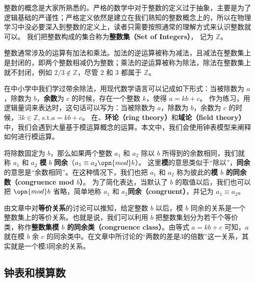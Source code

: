 


整数的概念是大家所熟悉的。严格的数学中对于整数的定义过于抽象，主要是为了逻辑基础的严谨性；严格定义依然是建立在我们熟知的整数概念上的，所以在物理学习中没必要深入到整数的定义上，读者只需要按照通常的理解方式来认识整数就可以。 我们把整数构成的集合称为\textbf{整数集（Set of Integers）}， 记为 $\mathbb{Z}$。

整数通常涉及的运算有加法和乘法。加法的逆运算被称为减法，且减法在整数集上是封闭的，即两个整数相减仍为整数；乘法的逆运算被称为除法，除法在整数集上就不封闭，例如 $2/3\not\in\mathbb{Z}$，尽管 $2$ 和 $3$ 都属于 $\mathbb{Z}$。

在中小学中我们学过带余除法，用现代数学语言可以记成如下形式：当被除数为 $a$，除数为 $b$，\textbf{余数}为 $c$ 的时候，存在一个整数 $k$，使得 $a=kb+c$。 作为练习，用逻辑量词来表达时，这句话可以写为：当被除数为 $a$，除数为 $b$，余数为 $c$ 的时候，$\exists k\in \mathbb{Z}$, s.t.$ a=kb+c$。 在、\textbf{环论（ring theory）}和\textbf{域论（field theory）}中，我们会遇到大量基于模运算概念的运算。本文中，我们会使用钟表模型来阐释如何进行模运算。

将除数固定为 $b$，那么如果两个整数 $a_1$ 和 $a_2$ 除以 $b$ 所得到的余数相同，我们就称 $a_1$ 和 $a_2$ \textbf{模} $b$ \textbf{同余}（$a_1\equiv a_2 \opn{mod} b$）。 这里\textbf{模}的意思类似于“除以”，\textbf{同余}的意思是“余数相同”。在这种情况下，我们也把 $a_1$ 和 $a_2$ 称为彼此的\textbf{模 $b$ 的同余数（congruence mod $b$）}。 为了简化表达，当默认了 $b$ 的取值以后，我们也可以把 $\opn{mod} b$ 省略，简单地称 $a_1$ 和 $a_2$\textbf{同余（congruent）}，并记为 $a_1\equiv a_2$。 

由文章中对\textbf{等价关系}的讨论可以推知，给定整数 $b$ 以后，模 $b$ 同余的关系是一个整数集上的等价关系。也就是说，我们可以利用 $b$ 把整数集划分为若干个等价类，称作\textbf{整数集模 $b$ 的同余类（congruence class）}。由等式 $a=kb+c$ 可知，$a$ 就在模 $b$ 余 $c$ 的同余类中。在文章中所讨论的“两数的差是3的倍数”这一关系，其实就是一个模3同余的关系。



\subsection{钟表和模算数}

